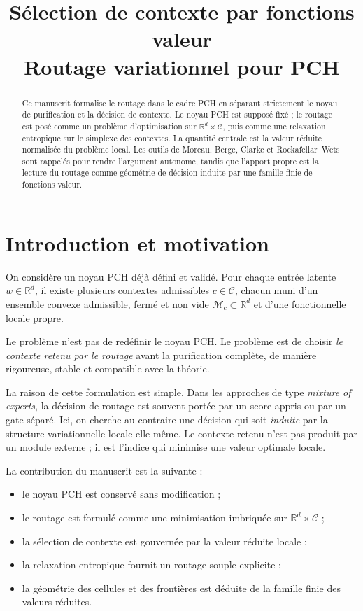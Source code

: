 \documentclass[11pt,a4paper]{article}
\title{Sélection de contexte par fonctions valeur\\
\large Routage variationnel pour PCH}
\author{}
\date{}
\newcommand{\R}{\mathbb R}
\newcommand{\Mcal}{\mathcal M}
\newcommand{\Ccal}{\mathcal C}
\begin{document}
\maketitle

\begin{abstract}
Ce manuscrit formalise le routage dans le cadre PCH en séparant strictement le noyau de purification et la décision de contexte. Le noyau PCH est supposé fixé ; le routage est posé comme un problème d'optimisation sur \(\R^d\times\Ccal\), puis comme une relaxation entropique sur le simplexe des contextes. La quantité centrale est la valeur réduite normalisée du problème local. Les outils de Moreau, Berge, Clarke et Rockafellar--Wets sont rappelés pour rendre l'argument autonome, tandis que l'apport propre est la lecture du routage comme géométrie de décision induite par une famille finie de fonctions valeur.
\end{abstract}

\tableofcontents

\section{Introduction et motivation}

On considère un noyau PCH déjà défini et validé. Pour chaque entrée latente \(w\in\R^d\), il existe plusieurs contextes admissibles \(c\in\Ccal\), chacun muni d'un ensemble convexe admissible, fermé et non vide \(\Mcal_c\subset\R^d\) et d'une fonctionnelle locale propre.

Le problème n'est pas de redéfinir le noyau PCH. Le problème est de choisir \emph{le contexte retenu par le routage} avant la purification complète, de manière rigoureuse, stable et compatible avec la théorie.

La raison de cette formulation est simple. Dans les approches de type \emph{mixture of experts}, la décision de routage est souvent portée par un score appris ou par un gate séparé. Ici, on cherche au contraire une décision qui soit \emph{induite} par la structure variationnelle locale elle-même. Le contexte retenu n'est pas produit par un module externe ; il est l'indice qui minimise une valeur optimale locale.

La contribution du manuscrit est la suivante :
\begin{itemize}[leftmargin=2em]
    \item le noyau PCH est conservé sans modification ;
    \item le routage est formulé comme une minimisation imbriquée sur \(\R^d\times\Ccal\) ;
    \item la sélection de contexte est gouvernée par la valeur réduite locale ;
    \item la relaxation entropique fournit un routage souple explicite ;
    \item la géométrie des cellules et des frontières est déduite de la famille finie des valeurs réduites.
\end{itemize}
\end{document}
